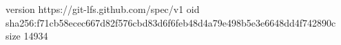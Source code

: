 version https://git-lfs.github.com/spec/v1
oid sha256:f71cb58ecec667d82f576cbd83d6f6feb48d4a79e498b5e3e6648dd4f742890c
size 14934
